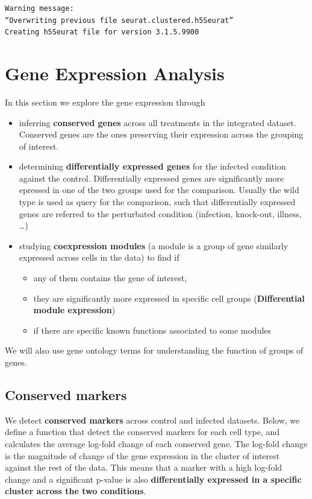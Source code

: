 \documentclass[
  letterpaper,
  DIV=11,
  numbers=noendperiod]{scrartcl}
\providecommand{\tightlist}{%
  \setlength{\itemsep}{0pt}\setlength{\parskip}{0pt}}\usepackage{longtable,booktabs,array}
\begin{document}
\begin{verbatim}
Warning message:
“Overwriting previous file seurat.clustered.h5Seurat”
Creating h5Seurat file for version 3.1.5.9900
\end{verbatim}

\section{Gene Expression Analysis}\label{sec-geneanalysis}

In this section we explore the gene expression through

\begin{itemize}
\tightlist
\item
  inferring \textbf{conserved genes} across all treatments in the
  integrated dataset. Conserved genes are the ones preserving their
  expression across the grouping of interest.
\item
  determining \textbf{differentially expressed genes} for the infected
  condition against the control. Differentially expressed genes are
  significantly more epressed in one of the two groups used for the
  comparison. Usually the wild type is used as query for the comparison,
  such that differentially expressed genes are referred to the
  perturbated condition (infection, knock-out, illness, \ldots)
\item
  studying \textbf{coexpression modules} (a module is a group of gene
  similarly expressed across cells in the data) to find if

  \begin{itemize}
  \tightlist
  \item
    any of them contains the gene of interest,
  \item
    they are significantly more expressed in specific cell groups
    (\textbf{Differential module expression})
  \item
    if there are specific known functions associated to some modules
  \end{itemize}
\end{itemize}

We will also use gene ontology terms for understanding the function of
groups of genes.

\subsection{Conserved markers}\label{conserved-markers}

We detect \textbf{conserved markers} across control and infected
datasets. Below, we define a function that detect the conserved markers
for each cell type, and calculates the average log-fold change of each
conserved gene. The log-fold change is the magnitude of change of the
gene expression in the cluster of interest against the rest of the data.
This means that a marker with a high log-fold change and a significant
p-value is also \textbf{differentially expressed in a specific cluster
across the two conditions}.
\end{document}
